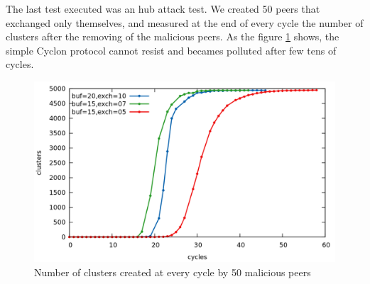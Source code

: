 \documentclass[a4paper,12pt,notitlepage]{article} %
\begin{document}
The last test executed was an hub attack test. We created 50 peers that exchanged only themselves, and measured
 at the end of every cycle the number of clusters after the removing of the malicious peers. As the 
 figure \ref{attack} shows, the simple Cyclon protocol cannot resist and becames polluted after few tens of cycles.

\begin{figure} [H]
	\centering
	\includegraphics[width=1\textwidth]{img/attack}
	\caption{Number of clusters created at every cycle by 50 malicious peers}
	\label{attack}
\end{figure}



  
\end{document}
